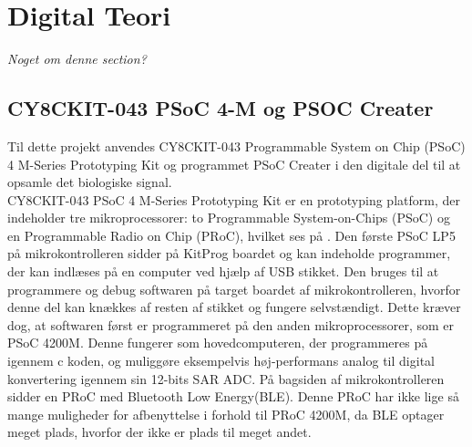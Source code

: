 \section{Digital Teori}
\textit{Noget om denne section?}

\subsection{CY8CKIT-043 PSoC 4-M og PSOC Creater}
Til dette projekt anvendes CY8CKIT-043 Programmable System on Chip (PSoC) 4 M-Series Prototyping Kit og programmet PSoC Creater i den digitale del til at opsamle det biologiske signal.\\
CY8CKIT-043 PSoC 4 M-Series Prototyping Kit er en prototyping platform, der indeholder tre mikroprocessorer: to Programmable System-on-Chips (PSoC) og en Programmable Radio on Chip (PRoC), hvilket ses på . Den første PSoC LP5 på mikrokontrolleren sidder på KitProg boardet og kan indeholde programmer, der kan indlæses på en computer ved hjælp af USB stikket. Den bruges til at programmere og debug softwaren på target boardet af mikrokontrolleren, hvorfor denne del kan knækkes af resten af stikket og fungere selvstændigt. Dette kræver dog, at softwaren først er programmeret på den anden mikroprocessorer, som er PSoC 4200M. Denne fungerer som hovedcomputeren, der programmeres på igennem c koden, og muliggøre eksempelvis høj-performans analog til digital konvertering igennem sin 12-bits SAR ADC. På bagsiden af mikrokontrolleren sidder en PRoC med Bluetooth Low Energy(BLE). Denne PRoC har ikke lige så mange muligheder for afbenyttelse i forhold til PRoC 4200M, da BLE optager meget plads, hvorfor der ikke er plads til meget andet. \citep{CYPRESS2016PSoC,Semiconductor2016,CYPRESS2016Cortexm0}
